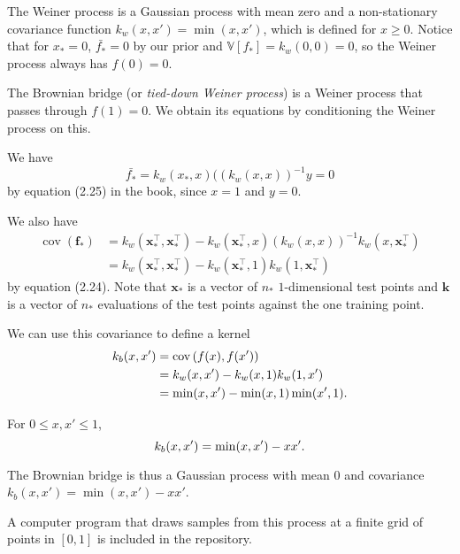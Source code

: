 \documentclass[oneside,a4paper]{article}
\newcommand{\bff}{\mathbf{f}}
\newcommand{\bfk}{\mathbf{k}}
\newcommand{\bfx}{\mathbf{x}}
\DeclareMathOperator{\cov}{cov}
\begin{document}
The Weiner process is a Gaussian process with mean zero and a non-stationary covariance function $k_w(x, x') = \min(x, x')$, which is defined for $x \geq 0$. Notice that for $x_* = 0$, $\bar{f_*} = 0$ by our prior and $\mathbb{V}[f_*] = k_w(0, 0) = 0$, so the Weiner process always has $f(0) = 0$.

The Brownian bridge (or \emph{tied-down Weiner process}) is a Weiner process that passes through $f(1) = 0$. We obtain its equations by conditioning the Weiner process on this.

We have \[
	\bar{f_*} = k_w(x_*, x)((k_w(x, x))^{-1}y = 0
\] by equation (2.25) in the book, since $x = 1$ and $y = 0$.

We also have \begin{align*}
	\cov(\bff_*) &= k_w(\bfx_*^\top, \bfx_*^\top) - k_w(\bfx_*^\top, x)(k_w(x, x))^{-1}k_w(x, \bfx_*^\top) \\
	&= k_w(\bfx_*^\top, \bfx_*^\top) - k_w(\bfx_*^\top, 1)k_w(1, \bfx_*^\top)
\end{align*} by equation (2.24). Note that $\bfx_*$ is a vector of $n_*$ $1$-dimensional test points and $\bfk$ is a vector of $n_*$ evaluations of the test points against the one training point.

We can use this covariance to define a kernel \begin{align*}
	k_b(x, x') &= \cov\left(f(x), f(x')\right) \\
	&= k_w(x, x') - k_w(x, 1)k_w(1, x') \\
	&= \min(x, x') - \min(x, 1)\min(x', 1) \text.
\end{align*}

For $0 \leq x, x' \leq 1$, \[
	k_b(x, x') = \min(x, x') - xx' \text.
\]

The Brownian bridge is thus a Gaussian process with mean $0$ and covariance $k_b(x, x') = \min(x, x') - xx'$.

A computer program that draws samples from this process at a finite grid of points in $[0, 1]$ is included in the repository.
\end{document}
